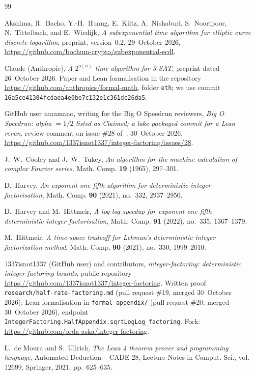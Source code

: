 \documentclass[10pt]{amsart}
\theoremstyle{plain}
\theoremstyle{definition}
\theoremstyle{remark}
\numberwithin{equation}{section}
\begin{document}
\begin{thebibliography}{99}

Akshima, R.~Bacho, Y.-H.~Huang, E.~Kiltz, A.~Nishaburi, S.~Nooripoor, N.~Tittelbach, and E.~Wiedijk,
\emph{A subexponential time algorithm for elliptic curve discrete logarithm}, preprint, version~0.2,
29~October 2026, \url{https://github.com/bochum-crypto/subexponential-ecdl}.

Claude (Anthropic), \emph{A $2^{o(n)}$ time algorithm for {3-SAT}}, preprint dated 26~October 2026.
Paper and Lean formalisation in the repository \url{https://github.com/anthropics/formal-math}, folder
\texttt{eth}; we use commit \texttt{16a5ce41304fcdaea4e0be7c132e1c361dc26da5}.

GitHub user nmamano, writing for the Big O Speedrun reviewers, \emph{Big O Speedrun: alpha $=1/2$ listed as Claimed;
a lake-packaged commit for a Lean rerun}, review comment on issue \#28 of~\cite{IF26}, 30~October 2026,
\url{https://github.com/1337isnot1337/integer-factoring/issues/28}.

J.~W.~Cooley and J.~W.~Tukey, \emph{An algorithm for the machine calculation of complex Fourier series},
Math. Comp. \textbf{19} (1965), 297--301.

D.~Harvey, \emph{An exponent one-fifth algorithm for deterministic integer factorisation}, Math. Comp.
\textbf{90} (2021), no.~332, 2937--2950.

D.~Harvey and M.~Hittmeir, \emph{A log-log speedup for exponent one-fifth deterministic integer
factorisation}, Math. Comp. \textbf{91} (2022), no.~335, 1367--1379.

M.~Hittmeir, \emph{A time-space tradeoff for {L}ehman's deterministic integer factorization method},
Math. Comp. \textbf{90} (2021), no.~330, 1999--2010.

1337isnot1337 (GitHub user) and contributors, \emph{integer-factoring: deterministic integer factoring
bounds}, public repository \url{https://github.com/1337isnot1337/integer-factoring}. Written proof
\texttt{research/half-rate-factoring.md} (pull request \#19, merged 30~October 2026); Lean formalisation in
\texttt{formal-appendix/} (pull request \#20, merged 30~October 2026), endpoint
\texttt{IntegerFactoring.HalfAppendix.sqrtLogLog\_factoring}. Fork:
\url{https://github.com/orda-aska/integer-factoring}.

L.~de Moura and S.~Ullrich, \emph{The {L}ean 4 theorem prover and programming language}, Automated
Deduction -- CADE 28, Lecture Notes in Comput. Sci., vol. 12699, Springer, 2021, pp.~625--635.


\end{thebibliography}
\end{document}
